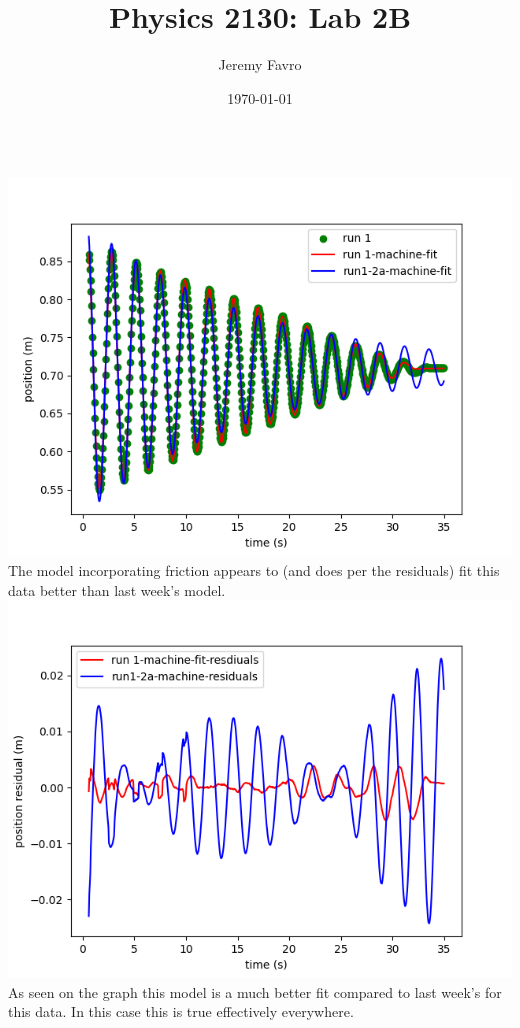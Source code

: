 \documentclass[10pt]{article}
\title{Physics 2130: Lab 2B}
\author{Jeremy Favro}
\date{\today}
\theoremstyle{definition}
\begin{document}
\maketitle

\inputminted{python}{lab2b.py}
\newpage
\includegraphics{Figure_0.png}\\
The model incorporating friction appears to (and does per the residuals) fit this data better than last week's model. \\
\includegraphics{Figure_99-R1R.png}\\
As seen on the graph this model is a much better fit compared to last week's for this data. In this case this is true effectively everywhere.
\end{document}
